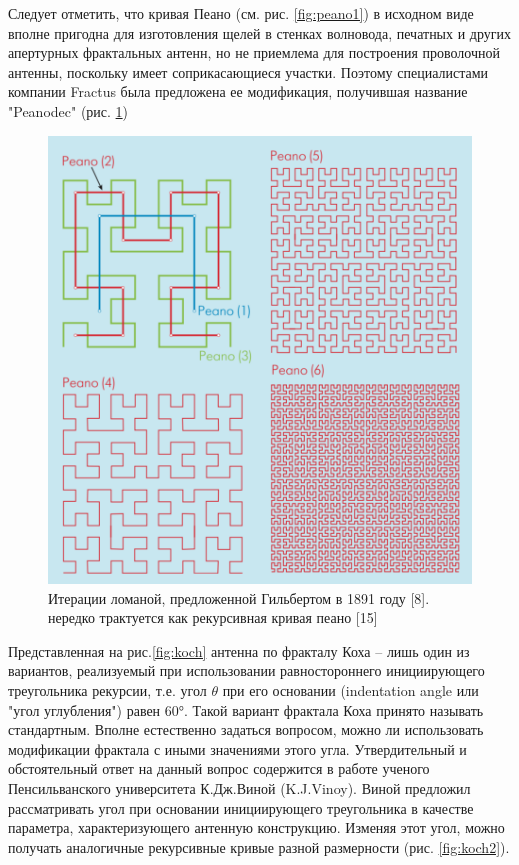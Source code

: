 Следует отметить, что кривая Пеано (см. рис. \ref{fig:peano1}) в исходном виде вполне пригодна для изготовления щелей в стенках волновода, печатных и других апертурных фрактальных антенн, но не приемлема для построения проволочной антенны, поскольку имеет соприкасающиеся участки. Поэтому специалистами компании Fractus была предложена ее модификация, получившая название "Peanodec" (рис. \ref{fig:peano2})

\begin{figure}[H]
    \centering
    \includegraphics[width=.9\textwidth]{img/peano2.png}
    \caption{Итерации ломаной, предложенной Гильбертом в 1891 году [8]. нередко трактуется как рекурсивная кривая пеано [15]}
    \label{fig:peano2}
\end{figure}

Представленная на рис.\ref{fig:koch} антенна по фракталу Коха – лишь один из вариантов, реализуемый при использовании равностороннего инициирующего треугольника рекурсии, т.е. угол $\theta$ при его основании (indentation angle или "угол углубления") равен 60°. Такой вариант фрактала Коха принято называть стандартным. Вполне естественно задаться вопросом, можно ли использовать модификации фрактала с иными значениями этого угла. Утвердительный и обстоятельный ответ на данный вопрос содержится в работе ученого Пенсильванского университета К.Дж.Виной (K.J.Vinoy). Виной предложил рассматривать угол при основании инициирующего треугольника в качестве параметра, характеризующего антенную конструкцию. Изменяя этот угол, можно получать аналогичные рекурсивные кривые разной размерности (рис. \ref{fig:koch2}).

